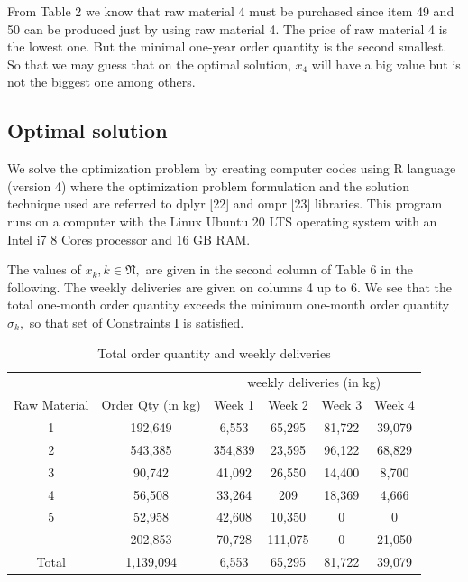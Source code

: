 \documentclass[preprint, 3p,
authoryear]{elsarticle} %
\begin{document}
From Table 2 we know that raw material 4 must be purchased since item 49
and 50 can be produced just by using raw material 4. The price of raw
material 4 is the lowest one. But the minimal one-year order quantity is
the second smallest. So that we may guess that on the optimal solution,
\(x_4\) will have a big value but is not the biggest one among others.

\hypertarget{optimal-solution}{%
\subsection{Optimal solution}\label{optimal-solution}}

We solve the optimization problem by creating computer codes using R
language (version 4) where the optimization problem formulation and the
solution technique used are referred to dplyr {[}22{]} and ompr {[}23{]}
libraries. This program runs on a computer with the Linux Ubuntu 20 LTS
operating system with an Intel i7 8 Cores processor and 16 GB RAM.

The values of \(x_k,k \in \mathfrak{N},\) are given in the second column
of Table 6 in the following. The weekly deliveries are given on columns
4 up to 6. We see that the total one-month order quantity exceeds the
minimum one-month order quantity \(\sigma_k,\) so that set of
Constraints I is satisfied.

\begin{table}[!h]

\caption{\label{tab:unnamed-chunk-9}Total order quantity and weekly deliveries}
\centering
\begin{tabular}[t]{cccccc}
\toprule
\multicolumn{2}{c}{ } & \multicolumn{4}{c}{weekly deliveries (in kg)} \\
\cmidrule(l{3pt}r{3pt}){3-6}
Raw Material & Order Qty
(in kg) & Week 1 & Week 2 & Week 3 & Week 4\\
\midrule
1 & 192,649 & 6,553 & 65,295 & 81,722 & 39,079\\
2 & 543,385 & 354,839 & 23,595 & 96,122 & 68,829\\
3 & 90,742 & 41,092 & 26,550 & 14,400 & 8,700\\
4 & 56,508 & 33,264 & 209 & 18,369 & 4,666\\
5 & 52,958 & 42,608 & 10,350 & 0 & 0\\
\addlinespace
6 & 202,853 & 70,728 & 111,075 & 0 & 21,050\\
Total & 1,139,094 & 6,553 & 65,295 & 81,722 & 39,079\\
\bottomrule
\end{tabular}
\end{table}
\end{document}
